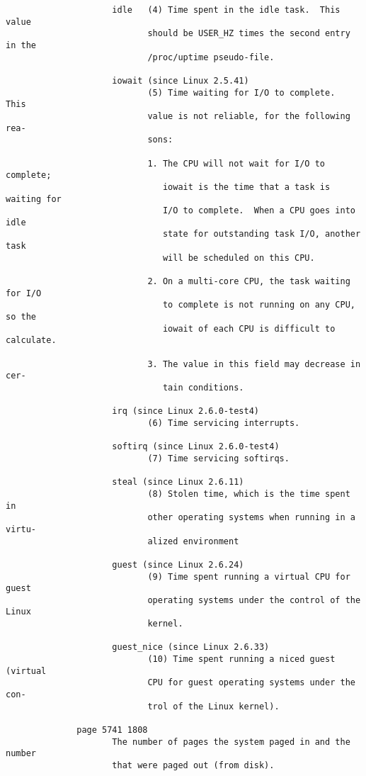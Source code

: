 \documentclass[]{article}
\begin{document}
\begin{verbatim}
                     idle   (4) Time spent in the idle task.  This value
                            should be USER_HZ times the second entry in the
                            /proc/uptime pseudo-file.

                     iowait (since Linux 2.5.41)
                            (5) Time waiting for I/O to complete.  This
                            value is not reliable, for the following rea‐
                            sons:

                            1. The CPU will not wait for I/O to complete;
                               iowait is the time that a task is waiting for
                               I/O to complete.  When a CPU goes into idle
                               state for outstanding task I/O, another task
                               will be scheduled on this CPU.

                            2. On a multi-core CPU, the task waiting for I/O
                               to complete is not running on any CPU, so the
                               iowait of each CPU is difficult to calculate.

                            3. The value in this field may decrease in cer‐
                               tain conditions.

                     irq (since Linux 2.6.0-test4)
                            (6) Time servicing interrupts.

                     softirq (since Linux 2.6.0-test4)
                            (7) Time servicing softirqs.

                     steal (since Linux 2.6.11)
                            (8) Stolen time, which is the time spent in
                            other operating systems when running in a virtu‐
                            alized environment

                     guest (since Linux 2.6.24)
                            (9) Time spent running a virtual CPU for guest
                            operating systems under the control of the Linux
                            kernel.

                     guest_nice (since Linux 2.6.33)
                            (10) Time spent running a niced guest (virtual
                            CPU for guest operating systems under the con‐
                            trol of the Linux kernel).

              page 5741 1808
                     The number of pages the system paged in and the number
                     that were paged out (from disk).


\end{verbatim}
\end{document}
